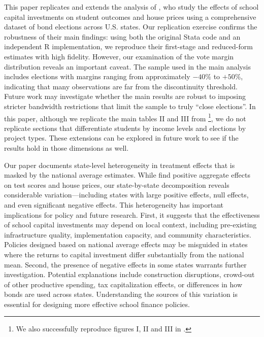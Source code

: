 \documentclass[12pt]{article}
\begin{document}
This paper replicates and extends the analysis of \citet{biasi_what_2025}, who study the effects of school capital investments on student outcomes and house prices using a comprehensive dataset of bond elections across U.S. states. Our replication exercise confirms the robustness of their main findings: using both the original Stata code and an independent R implementation, we reproduce their first-stage and reduced-form estimates with high fidelity. However, our examination of the vote margin distribution reveals an important caveat. The sample used in the main analysis includes elections with margins ranging from approximately $-40\%$ to $+50\%$, indicating that many observations are far from the discontinuity threshold. Future work may investigate whether the main results are robust to imposing stricter bandwidth restrictions that limit the sample to truly ``close elections''. In this paper, although we replicate the main tables II and III from \cite{biasi_what_2025}\footnote{We also successfully reproduce figures I, II and III in \cite{biasi_what_2025}.}, we do not replicate sections that differentiate students by income levels and elections by project types. These extensions can be explored in future work to see if the results hold in those dimensions as well. 

Our paper documents state-level heterogeneity in treatment effects that is masked by the national average estimates. While \citet{biasi_what_2025} find positive aggregate effects on test scores and house prices, our state-by-state decomposition reveals considerable variation—including states with large positive effects, null effects, and even significant negative effects. This heterogeneity has important implications for policy and future research. First, it suggests that the effectiveness of school capital investments may depend on local context, including pre-existing infrastructure quality, implementation capacity, and community characteristics. Policies designed based on national average effects may be misguided in states where the returns to capital investment differ substantially from the national mean. Second, the presence of negative effects in some states warrants further investigation. Potential explanations include construction disruptions, crowd-out of other productive spending, tax capitalization effects, or differences in how bonds are used across states. Understanding the sources of this variation is essential for designing more effective school finance policies.
\end{document}
